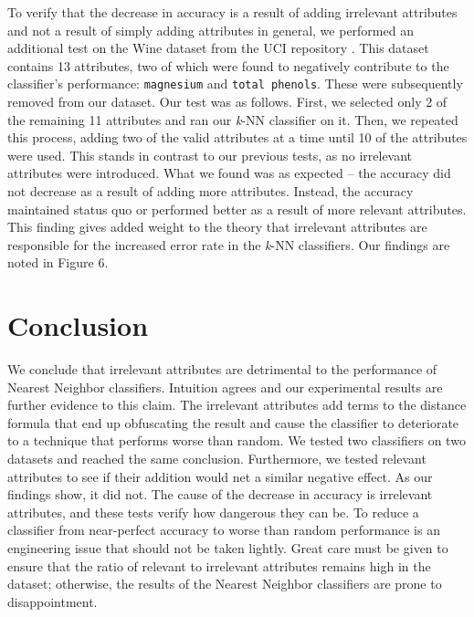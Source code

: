 \documentclass{article}
\begin{document}
To verify that the decrease in accuracy is a result of adding irrelevant attributes and not a result of simply adding attributes in general, we performed an additional test on the Wine dataset from the UCI repository \cite{wine}. This dataset contains 13 attributes, two of which were found to negatively contribute to
the classifier's performance: \texttt{magnesium} and \texttt{total phenols}. These were subsequently removed from our dataset. Our test was as follows. First, we selected only 2 of the remaining 11 attributes and ran our \textit{k}-NN classifier on it. Then, we repeated this process, adding two of the valid attributes at a time until 10 of the attributes were used. This stands in contrast to our previous tests, as no irrelevant attributes were introduced. What we found was as expected -- the accuracy did not decrease as a result of adding more attributes. Instead, the accuracy maintained status quo or performed better as a result of more relevant attributes. This finding gives added weight to the theory that irrelevant attributes are responsible for the increased error rate in the \textit{k}-NN classifiers. Our findings are noted in Figure 6. 

\section{Conclusion}

We conclude that irrelevant attributes are detrimental to the performance of Nearest Neighbor classifiers. Intuition agrees and our experimental results are further evidence to this claim. The irrelevant attributes add terms to the distance formula that end up obfuscating the result and cause the classifier to deteriorate to a technique that performs worse than random. We tested two classifiers on two datasets and reached the same conclusion. Furthermore, we tested relevant attributes to see if their addition would net a similar negative effect. As our findings show, it did not. The cause of the decrease in accuracy is irrelevant attributes, and these tests verify how dangerous they can be. To reduce a classifier from near-perfect accuracy to worse than random performance is an engineering issue that should not be taken lightly. Great care must be given to ensure that the ratio of relevant to irrelevant attributes remains high in the dataset; otherwise, the results of the Nearest Neighbor classifiers are prone to disappointment.


 
\end{document}

